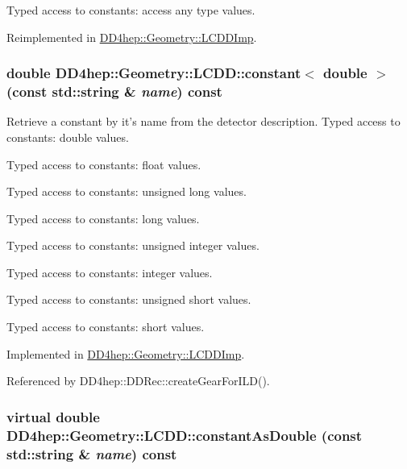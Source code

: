 Typed access to constants: access any type values. 

Reimplemented in \hyperlink{class_d_d4hep_1_1_geometry_1_1_l_c_d_d_imp_aa67202d22d5ce08316bbbc6f7b00fa1c}{DD4hep::Geometry::LCDDImp}.\hypertarget{class_d_d4hep_1_1_geometry_1_1_l_c_d_d_a636bc57de8b0334a83c52ef2b43c465d}{
\subsubsection[{constant}]{\setlength{\rightskip}{0pt plus 5cm}double DD4hep::Geometry::LCDD::constant$<$ double $>$ (const std::string \& {\em name}) const}}
\label{class_d_d4hep_1_1_geometry_1_1_l_c_d_d_a636bc57de8b0334a83c52ef2b43c465d}


Retrieve a constant by it's name from the detector description. Typed access to constants: double values.

Typed access to constants: float values.

Typed access to constants: unsigned long values.

Typed access to constants: long values.

Typed access to constants: unsigned integer values.

Typed access to constants: integer values.

Typed access to constants: unsigned short values.

Typed access to constants: short values. 

Implemented in \hyperlink{class_d_d4hep_1_1_geometry_1_1_l_c_d_d_imp_aa67202d22d5ce08316bbbc6f7b00fa1c}{DD4hep::Geometry::LCDDImp}.

Referenced by DD4hep::DDRec::createGearForILD().\hypertarget{class_d_d4hep_1_1_geometry_1_1_l_c_d_d_a9696a0bb5af8abd3667460a617d4dc83}{
\subsubsection[{constantAsDouble}]{\setlength{\rightskip}{0pt plus 5cm}virtual double DD4hep::Geometry::LCDD::constantAsDouble (const std::string \& {\em name}) const}}
\label{class_d_d4hep_1_1_geometry_1_1_l_c_d_d_a9696a0bb5af8abd3667460a617d4dc83}


